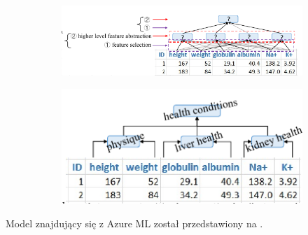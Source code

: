 \begin{figure}[H]
    \hfill
    \begin{subfigure}[m]{\textwidth}
        \centering
        \includegraphics[width=\textwidth]{images/danet_1}
    \end{subfigure}
    \hfill
    \begin{subfigure}[m]{\textwidth}
        \centering
        \includegraphics[width=\textwidth]{images/danet_2}
    \end{subfigure}
    \label{fig:danet-abst}
\end{figure}

Model znajdujący się z Azure ML został przedstawiony na .

